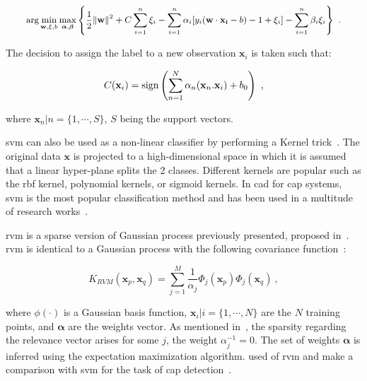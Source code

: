 \begin{equation}
\small
\arg\min_{\mathbf{w},\mathbf{\xi}, b } \max_{\boldsymbol{\alpha},\boldsymbol{\beta} } \left\{ \frac{1}{2}\|\mathbf{w}\|^2+C \sum_{i=1}^n \xi_i - \sum_{i=1}^{n}{\alpha_i[y_i(\mathbf{w}\cdot \mathbf{x_i} - b) -1 + \xi_i]} - \sum_{i=1}^{n} \beta_i \xi_i \right\} \ .
\end{equation}

The decision to assign the label to a new observation $\mathbf{x}_i$ is taken such that:

\begin{equation}
	C(\mathbf{x}_i) = \operatorname*{sign} \left( \sum_{n=1}^{N} \alpha_n (\mathbf{x}_n . \mathbf{x}_i) + b_0 \right) \ ,
	\label{eq:svmdec} 
\end{equation}

\noindent where $\mathbf{x}_n|n=\{1,\cdots,S\}$, $S$ being the support vectors.

\ac{svm} can also be used as a non-linear classifier by performing a Kernel trick~\cite{Boser1992}.
The original data $\mathbf{x}$ is projected to a high-dimensional space in which it is assumed that a linear hyper-plane splits the 2 classes.
Different kernels are popular such as the \ac{rbf} kernel, polynomial kernels, or sigmoid kernels.
In \ac{cad} for \ac{cap} systems, \ac{svm} is the most popular classification method and has been used in a multitude of research works~\cite{Artan2009,Artan2010,Chan2003,Litjens2011,Litjens2012,Liu2013,Lopes2011,Niaf2011,Niaf2012,Ozer2009,Ozer2010,Parfait2012,Peng2013,Sung2011,Tiwari2012,Vos2008,Vos2008a,Vos2010,Vos2012,giannini2015fully,trigui2017automatic,lehaire2014computer,khalvati2015automated,chung2015prostate}.

\Acf{rvm} is a sparse version of Gaussian process previously presented, proposed in~\cite{Tipping2001}.
\ac{rvm} is identical to a Gaussian process with the following covariance function~\cite{Quinonero-Candela2002}:

\begin{equation}
	K_{RVM}(\mathbf{x}_p,\mathbf{x}_q) = \sum_{j=1}^{M} \frac{1}{\alpha_j} \Phi_j ( \mathbf{x}_p ) \Phi_j ( \mathbf{x}_q ) \ ,
 	\label{eq:rvm}
\end{equation}

\noindent where $\phi(\cdot)$ is a Gaussian basis function, $\mathbf{x}_i|i=\{1,\cdots,N\}$ are the $N$ training points, and $\boldsymbol{\alpha}$ are the weights vector.
As mentioned in~\cite{Quinonero-Candela2002}, the sparsity regarding the relevance vector arises for some $j$, the weight $\alpha_j^{-1} = 0$.
The set of weights $\boldsymbol{\alpha}$ is inferred using the expectation maximization algorithm.
\citeauthor{Ozer2010} used of \ac{rvm} and make a comparison with \ac{svm} for the task of \ac{cap} detection~\cite{Ozer2009,Ozer2010}.

